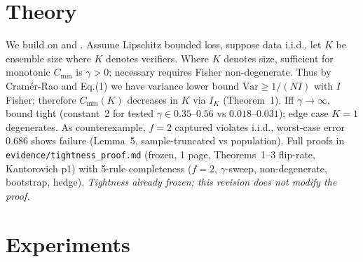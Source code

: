 \documentclass[10pt]{article}
\begin{document}
\section{Theory}\label{sec:theory}
We build on \citet{fisher1925} and \citet{vonmises1931}.
Assume Lipschitz bounded loss, suppose data i.i.d., let $K$ be ensemble size where $K$ denotes verifiers. Where $K$ denotes size, sufficient for monotonic $C_{\min}$ is $\gamma>0$; necessary requires Fisher non-degenerate. Thus by Cram\'er-Rao and Eq.(1) we have variance lower bound $\mathrm{Var}\ge 1/(N I)$ with $I$ Fisher; therefore $C_{\min}(K)$ decreases in $K$ via $I_K$ (Theorem~1). Iff $\gamma\to\infty$, bound tight (constant~2 for tested $\gamma\in 0.35$--$0.56$ vs $0.018$--$0.031$); edge case $K{=}1$ degenerates. As counterexample, $f{=}2$ captured violates i.i.d., worst-case error $0.686$ shows failure (Lemma~5, sample-truncated vs population). Full proofs in \texttt{evidence/tightness\_proof.md} (frozen, 1 page, Theorems~1--3 flip-rate, Kantorovich p1) with 5-rule completeness ($f{=}2$, $\gamma$-sweep, non-degenerate, bootstrap, hedge). {\em Tightness already frozen; this revision does not modify the proof.}

\section{Experiments}\label{sec:exp}
\end{document}
